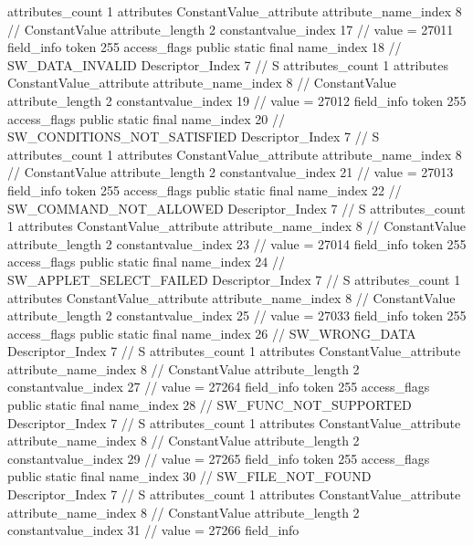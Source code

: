 {{{{{				attributes_count	1
				attributes {
				ConstantValue_attribute {
					attribute_name_index	8		// ConstantValue
					attribute_length	2
					constantvalue_index	17		// value = 27011
				}
				}
			}
			field_info {
				token	255
				access_flags	public static final
				name_index	18		// SW_DATA_INVALID
				Descriptor_Index	7		// S
				attributes_count	1
				attributes {
				ConstantValue_attribute {
					attribute_name_index	8		// ConstantValue
					attribute_length	2
					constantvalue_index	19		// value = 27012
				}
				}
			}
			field_info {
				token	255
				access_flags	public static final
				name_index	20		// SW_CONDITIONS_NOT_SATISFIED
				Descriptor_Index	7		// S
				attributes_count	1
				attributes {
				ConstantValue_attribute {
					attribute_name_index	8		// ConstantValue
					attribute_length	2
					constantvalue_index	21		// value = 27013
				}
				}
			}
			field_info {
				token	255
				access_flags	public static final
				name_index	22		// SW_COMMAND_NOT_ALLOWED
				Descriptor_Index	7		// S
				attributes_count	1
				attributes {
				ConstantValue_attribute {
					attribute_name_index	8		// ConstantValue
					attribute_length	2
					constantvalue_index	23		// value = 27014
				}
				}
			}
			field_info {
				token	255
				access_flags	public static final
				name_index	24		// SW_APPLET_SELECT_FAILED
				Descriptor_Index	7		// S
				attributes_count	1
				attributes {
				ConstantValue_attribute {
					attribute_name_index	8		// ConstantValue
					attribute_length	2
					constantvalue_index	25		// value = 27033
				}
				}
			}
			field_info {
				token	255
				access_flags	public static final
				name_index	26		// SW_WRONG_DATA
				Descriptor_Index	7		// S
				attributes_count	1
				attributes {
				ConstantValue_attribute {
					attribute_name_index	8		// ConstantValue
					attribute_length	2
					constantvalue_index	27		// value = 27264
				}
				}
			}
			field_info {
				token	255
				access_flags	public static final
				name_index	28		// SW_FUNC_NOT_SUPPORTED
				Descriptor_Index	7		// S
				attributes_count	1
				attributes {
				ConstantValue_attribute {
					attribute_name_index	8		// ConstantValue
					attribute_length	2
					constantvalue_index	29		// value = 27265
				}
				}
			}
			field_info {
				token	255
				access_flags	public static final
				name_index	30		// SW_FILE_NOT_FOUND
				Descriptor_Index	7		// S
				attributes_count	1
				attributes {
				ConstantValue_attribute {
					attribute_name_index	8		// ConstantValue
					attribute_length	2
					constantvalue_index	31		// value = 27266
				}
				}
			}
			field_info {
}}}}}
